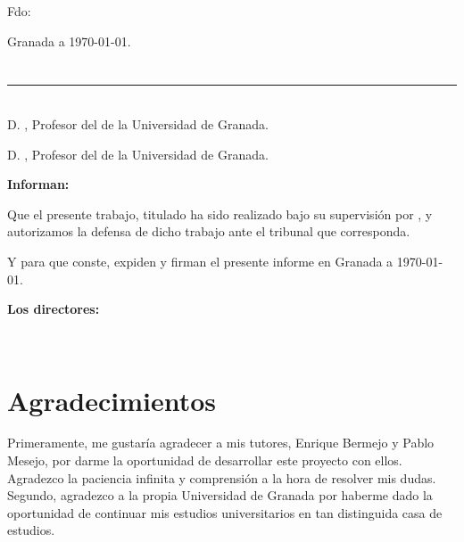 \vspace{6cm}

\noindent Fdo: \myName

\vspace{2cm}

\begin{flushright}
Granada a \today.
\end{flushright}


\chapter*{}
\thispagestyle{empty}

\noindent\rule[-1ex]{\textwidth}{2pt}\\[4.5ex]

D. \textbf{\myProf}, Profesor del \myDepartment de la Universidad de Granada.

\vspace{0.5cm}

D. \textbf{\myOtherProf}, Profesor del \myDepartment de la Universidad de Granada.


\vspace{0.5cm}

\textbf{Informan:}

\vspace{0.5cm}

Que el presente trabajo, titulado \textit{\textbf{\myTitle}}
ha sido realizado bajo su supervisión por \textbf{\myName}, y autorizamos la defensa de dicho trabajo ante el tribunal
que corresponda.

\vspace{0.5cm}

Y para que conste, expiden y firman el presente informe en Granada a \today.

\vspace{1cm}

\textbf{Los directores:}

\vspace{5cm}

\noindent \textbf{\myProf \ \ \ \ \ \myOtherProf}

\chapter*{Agradecimientos}

\thispagestyle{empty}
       \vspace{1cm}


Primeramente, me gustaría agradecer a mis tutores, Enrique Bermejo y Pablo Mesejo,
por darme la oportunidad de desarrollar este proyecto con ellos. 
Agradezco la paciencia infinita y comprensión a la hora de resolver mis dudas. 
Segundo, agradezco a la propia Universidad de Granada por haberme dado la oportunidad 
de continuar mis estudios universitarios en tan distinguida casa de estudios. 
\\


